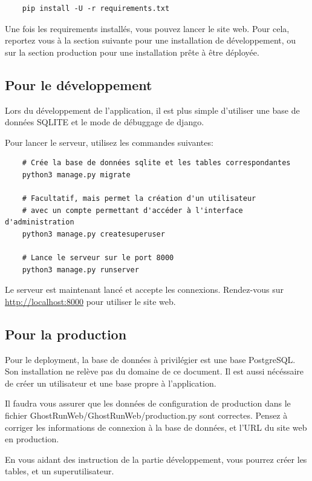 \begin{verbatim}
    pip install -U -r requirements.txt
\end{verbatim}

Une fois les requirements installés, vous pouvez lancer le site web. Pour cela, reportez vous à la section suivante pour une installation de développement, ou sur la section production pour une installation prête à être déployée.

\subsection{Pour le développement}

Lors du développement de l'application, il est plus simple d'utiliser une base de données SQLITE et le mode de débuggage de \Gls{django}.

Pour lancer le serveur, utilisez les commandes suivantes:
\begin{verbatim}
    # Crée la base de données sqlite et les tables correspondantes
    python3 manage.py migrate

    # Facultatif, mais permet la création d'un utilisateur
    # avec un compte permettant d'accéder à l'interface d'administration
    python3 manage.py createsuperuser

    # Lance le serveur sur le port 8000
    python3 manage.py runserver
\end{verbatim}

Le serveur est maintenant lancé et accepte les connexions. Rendez-vous sur \url{http://localhost:8000} pour utiliser le site web.

\subsection{Pour la production}

Pour le deployment, la base de données à privilégier est une base PostgreSQL. Son installation ne relève pas du domaine de ce document. Il est aussi nécéssaire de créer un utilisateur et une base propre à l'application.

Il faudra vous assurer que les données de configuration de production dans le fichier GhostRunWeb/GhostRunWeb/production.py sont correctes. Pensez à corriger les informations de connexion à la base de données, et l'URL du site web en production.

En vous aidant des instruction de la partie développement, vous pourrez créer les tables, et un superutilisateur.

